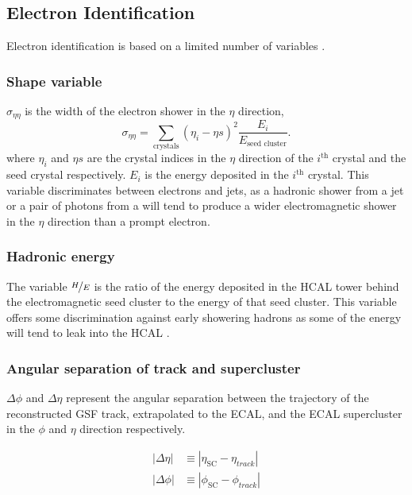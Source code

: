 \subsection{Electron Identification}
\label{sec:eid}
Electron identification is based on a limited number of variables
\cite{daskalakis2009data,baffioni2009identification}.

\subsubsection{Shape variable}

$\sigma_{\eta\eta}$ is the width of the electron shower in the $\eta$
direction,
\begin{equation}
\sigma_{\eta\eta} = 
\sum_{\text{crystals}} \left(\eta_{i} - \eta{s}\right)^{2}
\frac{E_{i}}{E_{\text{seed cluster}}}.
\end{equation}
where $\eta_{i}$ and $\eta{s}$ are the crystal indices in the $\eta$
direction of the $i^{\mathrm{th}}$ crystal and the seed crystal respectively.
$E_i$ is the energy deposited in the $i^{\mathrm{th}}$ crystal.  This variable
discriminates between electrons and jets, as a hadronic shower from a jet or a
pair of photons from a \Ppizero will tend to produce a wider electromagnetic
shower in the $\eta$ direction than a prompt electron.

\subsubsection{Hadronic energy}
The variable $\nicefrac{H}{E}$ is the ratio of the energy deposited in the HCAL
tower behind the electromagnetic seed cluster to the energy of that seed
cluster. This variable offers some discrimination against early showering
hadrons as some of the energy will tend to leak into the HCAL
\cite{baffioni2009identification}.

\subsubsection{Angular separation of track and supercluster}
$\Delta\phi$ and $\Delta\eta$ represent the angular separation between the
trajectory of the reconstructed {GSF} track, extrapolated to the ECAL, and
the ECAL supercluster in the $\phi$ and $\eta$ direction respectively.

\begin{align}
|\Delta\eta| &\equiv |\eta_{\text{SC}} - \eta_{track}|\\
|\Delta\phi| &\equiv |\phi_{\text{SC}} - \phi_{track}|
\end{align}


